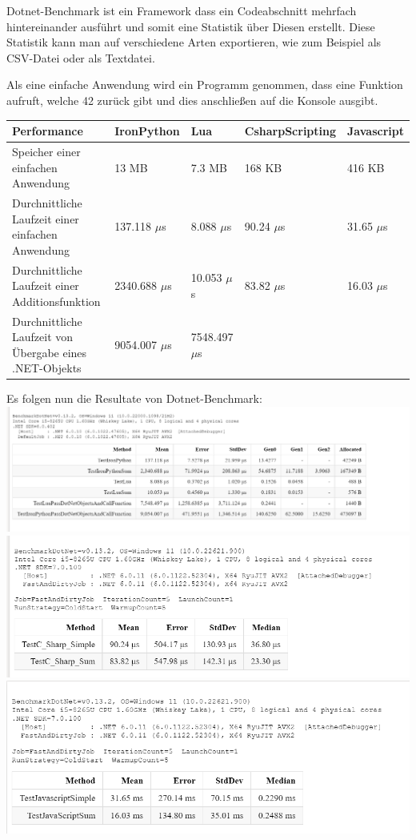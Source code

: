 Dotnet-Benchmark ist ein Framework dass ein Codeabschnitt mehrfach hintereinander ausführt 
und somit eine Statistik über Diesen erstellt. Diese Statistik kann man auf verschiedene Arten exportieren, wie zum Beispiel als CSV-Datei oder als Textdatei.

Als eine einfache Anwendung wird ein Programm genommen, dass eine Funktion aufruft, welche 42 zurück gibt 
und dies anschließen auf die Konsole ausgibt.
\begin{table}[H]
    \begin{tabular}{|p{3cm}|p{3cm}|p{3cm}|p{3cm}|p{3cm}|}
        \hline
        Performance & IronPython & Lua & CsharpScripting & Javascript\\ \hline
        Speicher einer einfachen Anwendung & 13 MB & 7.3 MB & 168 KB & 416 KB  \\ \hline
        Durchnittliche Laufzeit einer einfachen Anwendung & 137.118 $\mu$s & 8.088 $\mu$s & 90.24 $\mu$s & 31.65 $\mu$s \\ \hline
        Durchnittliche Laufzeit einer Additionsfunktion & 2340.688 $\mu$s & 10.053 $\mu$s & 83.82 $\mu$s & 16.03 $\mu$s \\ \hline
        Durchnittliche Laufzeit von Übergabe eines .NET-Objekts & 9054.007 $\mu$s & 7548.497 $\mu$s &  & \\ \hline
    \end{tabular}
\end{table}

\newpage
Es folgen nun die Resultate von Dotnet-Benchmark:
\linebreak
\includegraphics[scale=0.5]{pics/benchmark_results_NluaVsIronPython.png}
\linebreak
\includegraphics[scale=0.5]{pics/benchmark_results_csharpScript.png}
\linebreak
\includegraphics[scale=0.5]{pics/benchmark_results_javascript.png}
\newpage
